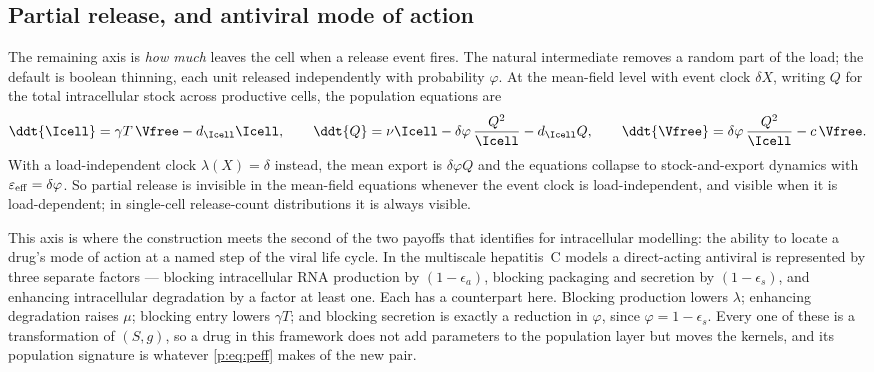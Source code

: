 \subsection{Partial release, and antiviral mode of action}
\label{p:sec:partial}

The remaining axis is \emph{how much} leaves the cell when a release event
fires. The natural intermediate removes a random part of the load; the
default is boolean thinning, each unit released independently with
probability $\varphi$. At the mean-field level with event clock $\delta X$,
writing $Q$ for the total intracellular stock across productive cells, the
population equations are
\begin{equation}
\ddt{\Icell}=\gamma T\,\Vfree-d_{\Icell}\Icell,
\qquad
\ddt{Q}=\nu\Icell-\delta\varphi\,\frac{Q^2}{\Icell}-d_{\Icell}Q,
\qquad
\ddt{\Vfree}=\delta\varphi\,\frac{Q^2}{\Icell}-c\,\Vfree.
\label{p:eq:partial}
\end{equation}
With a load-independent clock $\lambda(X)=\delta$ instead, the mean export is
$\delta\varphi Q$ and the equations collapse to stock-and-export dynamics
with $\varepsilon_{\rm eff}=\delta\varphi$. So partial release is invisible
in the mean-field equations whenever the event clock is load-independent,
and visible when it is load-dependent; in single-cell release-count
distributions it is always visible.

This axis is where the construction meets the second of the two payoffs that
\cite{ciupe2024incorporating} identifies for intracellular modelling: the
ability to locate a drug's mode of action at a named step of the viral life
cycle. In the multiscale hepatitis~C models
\cite{guedj2013modeling,rong2013mathematical} a direct-acting antiviral is
represented by three separate factors --- blocking intracellular RNA
production by $(1-\epsilon_a)$, blocking packaging and secretion by
$(1-\epsilon_s)$, and enhancing intracellular degradation by a factor at
least one. Each has a counterpart here. Blocking production lowers
$\lambda$; enhancing degradation raises $\mu$; blocking entry lowers
$\gamma T$; and blocking secretion is exactly a reduction in $\varphi$,
since $\varphi=1-\epsilon_s$. Every one of these is a transformation of
$(S,g)$, so a drug in this framework does not add parameters to the
population layer but moves the kernels, and its population signature is
whatever \cref{p:eq:peff} makes of the new pair.

